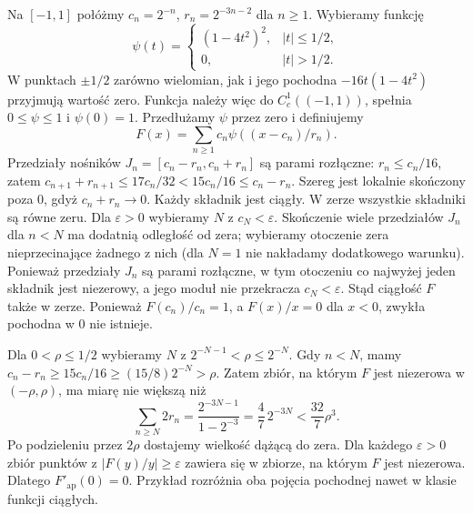\begin{przyklad}
\label{it:ex:approx-not-ordinary}
Na $[-1,1]$ połóżmy $c_n=2^{-n}$, $r_n=2^{-3n-2}$
dla $n\ge1$. Wybieramy funkcję
\[
 \psi(t)=\begin{cases}
 (1-4t^2)^2,& |t|\le1/2,\\
 0,& |t|>1/2.
 \end{cases}
\]
W punktach $\pm1/2$ zarówno wielomian, jak i jego
pochodna $-16t(1-4t^2)$ przyjmują wartość zero.
Funkcja należy więc do $C_c^1((-1,1))$,
spełnia $0\le\psi\le1$ i $\psi(0)=1$.
Przedłużamy $\psi$ przez zero i definiujemy
\[
 F(x)=\sum_{n\ge1}c_n\psi((x-c_n)/r_n).
\]
Przedziały nośników $J_n=[c_n-r_n,c_n+r_n]$
są parami rozłączne: $r_n\le c_n/16$, zatem
$c_{n+1}+r_{n+1}\le17c_n/32<15c_n/16\le c_n-r_n$.
Szereg jest lokalnie skończony poza $0$, gdyż
$c_n+r_n\to0$. Każdy składnik jest ciągły.
W zerze wszystkie składniki są równe zeru.
Dla $\varepsilon>0$ wybieramy $N$ z $c_N<\varepsilon$.
Skończenie wiele przedziałów $J_n$ dla $n<N$
ma dodatnią odległość od zera; wybieramy otoczenie
zera nieprzecinające żadnego z nich (dla $N=1$
nie nakładamy dodatkowego warunku).
Ponieważ przedziały $J_n$ są parami rozłączne,
w tym otoczeniu co najwyżej jeden składnik jest
niezerowy, a jego moduł nie przekracza
$c_N<\varepsilon$. Stąd ciągłość $F$ także w zerze.
Ponieważ $F(c_n)/c_n=1$, a $F(x)/x=0$ dla $x<0$,
zwykła pochodna w $0$ nie istnieje.

Dla $0<\rho\le1/2$ wybieramy $N$ z
$2^{-N-1}<\rho\le2^{-N}$. Gdy $n<N$, mamy
$c_n-r_n\ge15c_n/16\ge(15/8)2^{-N}>\rho$.
Zatem zbiór, na którym $F$ jest niezerowa w
$(-\rho,\rho)$, ma miarę nie większą niż
\[
 \sum_{n\ge N}2r_n
 =\frac{2^{-3N-1}}{1-2^{-3}}=\frac47\,2^{-3N}
 <\frac{32}{7}\rho^3.
\]
Po podzieleniu przez $2\rho$ dostajemy wielkość
dążącą do zera. Dla każdego $\varepsilon>0$ zbiór
punktów z $|F(y)/y|\ge\varepsilon$ zawiera się
w zbiorze, na którym $F$ jest niezerowa. Dlatego
$F'_{\mathrm{ap}}(0)=0$. Przykład rozróżnia oba
pojęcia pochodnej nawet w klasie funkcji ciągłych.
\end{przyklad}

